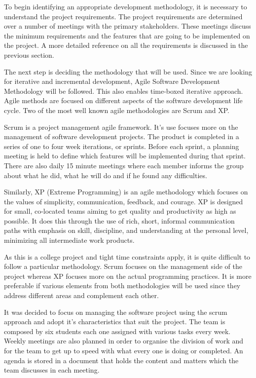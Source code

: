 To begin identifying an appropriate development methodology, it is necessary to understand the project requirements. The project requirements are determined over a number of meetings with the primary stakeholders. These meetings discuss the minimum requirements and the features that are going to be implemented on the project. A more detailed reference on all the requirements is discussed in the previous section.

The next step is deciding the methodology that will be used. Since we are looking for iterative and incremental development, Agile Software Development Methodology will be followed. This also enables time-boxed iterative approach. Agile methods are focused on different aspects of the software development life cycle. Two of the most well known agile methodologies are Scrum and XP.

Scrum is a project management agile framework. It’s use focuses more on the management of software development projects. The product is completed in a series of one to four week iterations, or sprints. Before each sprint, a planning meeting is held to define which features will be implemented during that sprint. There are also daily 15 minute meetings where each member informs the group about what he did, what he will do and if he found any difficulties. 

Similarly, XP (Extreme Programming) is an agile methodology which focuses on the values of simplicity, communication, feedback, and courage. XP is designed for small, co-located teams aiming to get quality and productivity as high as possible. It does this through the use of rich, short, informal communication paths with emphasis on skill, discipline, and understanding at the personal level, minimizing all intermediate work products. 

As this is a college project and tight time constraints apply, it is quite difficult to follow a particular methodology. Scrum focuses on the management side of the project whereas XP focuses more on the actual programming practices. It is more preferable if various elements from both methodologies will be used since they address different areas and complement each other.

It was decided to focus on managing the software project using the scrum approach and adopt it's characteristics that suit the project. The team is composed by six students each one assigned with various tasks every week. Weekly meetings are also planned in order to organise the division of work and for the team to get up to speed with what every one is doing or completed. An agenda is stored in a document that holds the content and matters which the team discusses in each meeting.

